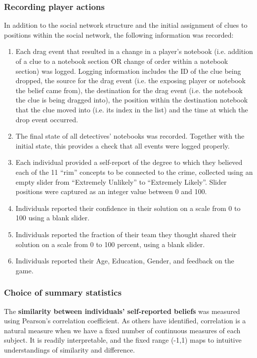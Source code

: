 \documentclass{article}
\begin{document}
\subsubsection{Recording player actions}
In addition to the social network structure and the initial assignment of clues to positions within the social network, the following information was recorded:
\begin{enumerate}
    \item Each drag event that resulted in a change in a player’s notebook (i.e. addition of a clue to a notebook section OR change of order within a notebook section) was logged. Logging information includes the ID of the clue being dropped, the source for the drag event (i.e. the exposing player or notebook the belief came from), the destination for the drag event (i.e. the notebook the clue is being dragged into), the position within the destination notebook that the clue moved into (i.e. its index in the list) and the time at which the drop event occurred.
    \item The final state of all detectives' notebooks was recorded. Together with the initial state, this provides a check that all events were logged properly.
    \item Each individual provided a self-report of the degree to which they believed each of the 11 “rim” concepts to be connected to the crime, collected using an empty slider from “Extremely Unlikely” to “Extremely Likely”. Slider positions were captured as an integer value between 0 and 100.
    \item Individuals reported their confidence in their solution on a scale from 0 to 100 using a blank slider. 
    \item Individuals reported the fraction of their team they thought shared their solution on a scale from 0 to 100 percent, using a blank slider.
    \item Individuals reported their Age, Education, Gender, and feedback on the game.
\end{enumerate}

\subsubsection{Choice of summary statistics}

The \textbf{similarity between individuals' self-reported beliefs} was measured using Pearson's correlation coefficient. 
As others have identified, \cite{goldberg2018beyond} correlation is a natural measure when we have a fixed number of continuous measures of each subject. It is readily interpretable, and the fixed range (-1,1) maps to intuitive understandings of similarity and difference.
	
\end{document}
